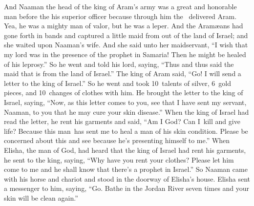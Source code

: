 
\begin{inparaenum}
   And Naaman the head of the king of Aram's army was a great and honorable man before the his superior officer because through him the \lord\ delivered Aram. Yea, he was a mighty man of valor, but he was a leper.%
   And the Aram\ae{}ans had gone forth in bands and captured a little maid from out of the land of Israel; and she waited upon Naaman's wife.%
   And she said unto her maidservant, ``I wish that my lord was in the presence of the prophet in Samaria! Then he might be healed of his leprosy.''%
   So he went and told his lord, saying, ``Thus and thus said the maid that is from the land of Israel.''%
   The king of Aram said, ``Go! I will send a letter to the king of Israel.'' So he went and took 10~talents of silver, 6~gold pieces, and 10~changes of clothes with him.%
   He brought the letter to the king of Israel, saying, ``Now, as this letter comes to you, see that I have sent my servant, Naaman, to you that he may cure your skin disease.''%
   When the king of Israel had read the letter, he rent his garments and said, ``Am I God? Can I\understood\ kill and give life? Because this man\understood\ has sent me to heal a man of his skin condition. Please be concerned about this and see because he's presenting himself to me.''%
   When Elisha, the man of God, had heard that the king of Israel had rent his garments, he sent to the king, saying, ``Why have you rent your clothes? Please let him come to me and he shall know that there's a prophet in Israel.''%
   So Naaman came with his horse and chariot and stood in the doorway of Elisha's house.%
   Elisha sent a messenger to him, saying, ``Go. Bathe in the Jordan River seven times and your skin will be clean again.''%

\end{inparaenum}
